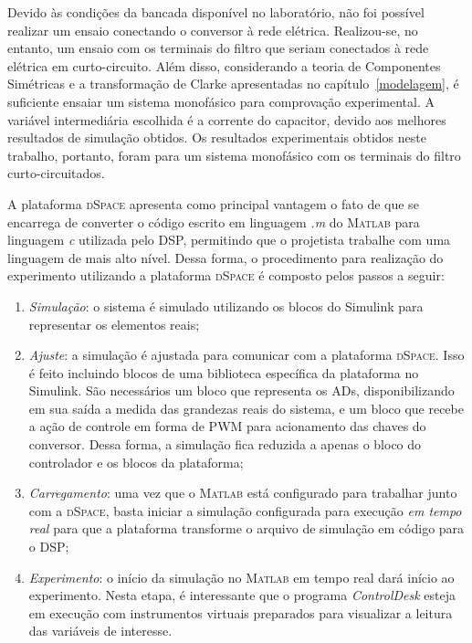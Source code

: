   Devido às condições da bancada disponível no laboratório, não foi possível realizar um ensaio conectando o conversor à rede elétrica. Realizou-se, no entanto, um ensaio com os terminais do filtro que seriam conectados à rede elétrica em curto-circuito. Além disso, considerando a teoria de Componentes Simétricas e a transformação de Clarke apresentadas no capítulo~\ref{modelagem}, é suficiente ensaiar um sistema monofásico para comprovação experimental. A variável intermediária escolhida é a corrente do capacitor, devido aos melhores resultados de simulação obtidos. Os resultados experimentais obtidos neste trabalho, portanto, foram para um sistema monofásico com os terminais do filtro curto-circuitados.

  A plataforma \textsc{dSpace} apresenta como principal vantagem o fato de que se encarrega de converter o código escrito em linguagem \emph{.m} do \textsc{Matlab} para linguagem \emph{c} utilizada pelo DSP, permitindo que o projetista trabalhe com uma linguagem de mais alto nível. Dessa forma, o procedimento para realização do experimento utilizando a plataforma \textsc{dSpace} é composto pelos passos a seguir:
  \begin{enumerate}
    \item \textit{Simulação}: o sistema é simulado utilizando os blocos do Simulink para representar os elementos reais;
    \item \textit{Ajuste}: a simulação é ajustada para comunicar com a plataforma \textsc{dSpace}. Isso é feito incluindo blocos de uma biblioteca específica da plataforma no Simulink. São necessários um bloco que representa os ADs, disponibilizando em sua saída a medida das grandezas reais do sistema, e um bloco que recebe a ação de controle em forma de PWM para acionamento das chaves do conversor. Dessa forma, a simulação fica reduzida a apenas o bloco do controlador e os blocos da plataforma;
    \item \textit{Carregamento}: uma vez que o \textsc{Matlab} está configurado para trabalhar junto com a \textsc{dSpace}, basta iniciar a simulação configurada para execução \emph{em tempo real} para que a plataforma transforme o arquivo de simulação em código para o DSP;
    \item \textit{Experimento}: o início da simulação no \textsc{Matlab} em tempo real dará início ao experimento. Nesta etapa, é interessante que o programa \emph{ControlDesk} esteja em execução com instrumentos virtuais preparados para visualizar a leitura das variáveis de interesse.
  \end{enumerate}

